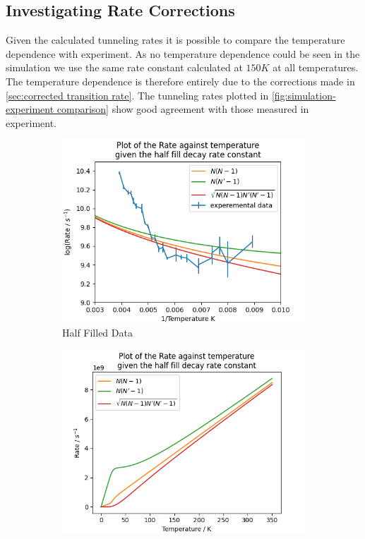 \subsection{Investigating Rate Corrections}
Given the calculated tunneling rates
it is possible to compare
the temperature dependence
with experiment.
As no temperature dependence
could be seen in the
simulation we use
the same rate constant calculated
at \(150K\) at all temperatures.
The temperature dependence
is therefore entirely
due to the corrections
made in
\cref{sec:corrected transition rate}.
The tunneling rates
plotted in
\cref{fig:simulation-experiment comparison}
show good agreement with
those measured in experiment.
\begin{figure}[htbp]
    \centering
    \begin{subfigure}{0.45\linewidth}
        \centering
        \includegraphics[width =0.9 \linewidth]{Figures/Simulation/Decay rate against temperature half fill 150K 1 spin.png}
        \caption{Half Filled Data
        }\label{sub@fig:half filled rates with experiment}
    \end{subfigure}
    \hfill
    \begin{subfigure}{0.45\linewidth}
        \centering
        \includegraphics[width = 0.9\linewidth]{Figures/Simulation/Decay rate against temperature half fill 150K 1 spin low temp.png}

\end{subfigure}
\end{figure}
